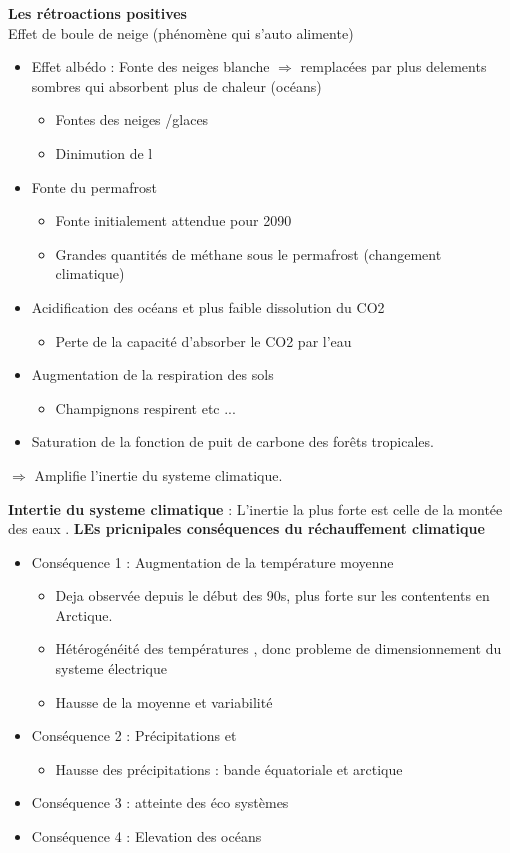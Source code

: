 \documentclass{article}
\begin{document}
\textbf{Les rétroactions positives} \\
Effet de boule de neige (phénomène qui s'auto alimente)
\begin{itemize}
	\item Effet albédo : Fonte des neiges blanche $\Rightarrow$ remplacées par plus delements sombres qui absorbent plus de chaleur (océans)
	\begin{itemize}
		\item	Fontes des neiges /glaces
		\item Dinimution de l
	\end{itemize}
	\item Fonte du permafrost
	\begin{itemize}
		\item Fonte initialement attendue pour 2090
		\item Grandes quantités de méthane sous le permafrost (changement climatique)
	\end{itemize}
	\item Acidification des océans et plus faible dissolution du CO2
	\begin{itemize}
		\item Perte de la capacité d'absorber le CO2 par l'eau
	\end{itemize}
	\item Augmentation de la respiration des sols
	\begin{itemize}
		\item Champignons respirent etc ...
	\end{itemize}
	\item Saturation de la fonction de puit de carbone des forêts tropicales.
\end{itemize}
$\Rightarrow$ Amplifie l'inertie du systeme climatique.

\textbf{Intertie du systeme climatique} : 
L'inertie la plus forte est celle de la montée des eaux .
\textbf{LEs pricnipales conséquences du réchauffement climatique}
\begin{itemize}
	\item Conséquence 1 : Augmentation de la température moyenne
	\begin{itemize}
		\item Deja observée depuis le début des 90s, plus forte sur les contentents en Arctique.
		\item Hétérogénéité des températures , donc probleme de dimensionnement du systeme électrique
		\item Hausse de la moyenne et variabilité
	\end{itemize}
	\item Conséquence 2 : Précipitations et 
	\begin{itemize}
		\item Hausse des précipitations : bande équatoriale et arctique 
	\end{itemize}	 
	\item Conséquence 3 : atteinte des éco systèmes 
	\item Conséquence 4 : Elevation des océans 
\end{itemize}
\end{document}
